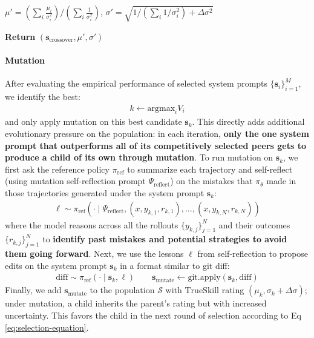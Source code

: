 \documentclass{article}
\theoremstyle{plain}
\theoremstyle{definition}
\theoremstyle{remark}
\begin{document}
\begin{algorithm}[t]
\begin{algorithmic}
        \STATE $\mu' = ({\sum}_{i}\frac{\mu_{i}}{\sigma_{i}^{2}})/({\sum}_{i}\frac{1}{\sigma_{i}^{2}})$, $\sigma' = \sqrt{{{1}/({{\sum}_{i}{{1}/{\sigma_{i}^{2}}}}) + \Delta \sigma^{2}}}$
        
        \STATE \textbf{Return} $(\mathbf{s}_{\text{crossover}}, \mu', \sigma')$
    \end{algorithmic}
\end{algorithm}

\vspace{-5pt}
\paragraph{Mutation} After evaluating the empirical performance of selected system prompts $\{\mathbf{s}_{i}\}_{i=1}^{M}$, we identify the best:
\begin{align}
    k \leftarrow \mathrm{argmax}_{i} V_{i}
\end{align}
and only apply mutation on this best candidate $\mathbf{s}_{k}$. This directly adds additional evolutionary pressure on the population: in each iteration, \textbf{only the one system prompt that outperforms all of its competitively selected peers gets to produce a child of its own through mutation}. To run mutation on $\mathbf{s}_{k}$,  we first ask the reference policy $\pi_{\text{ref}}$ to summarize each trajectory and self-reflect (using mutation self-reflection prompt $\Psi_{\text{reflect}}$) on the mistakes that $\pi_{\theta}$ made in those trajectories generated under the system prompt $\mathbf{s}_{k}$:
\begin{align*}
    \ell \sim \pi_{\text{ref}}(\cdot \mid \Psi_{\text{reflect}}, (x, y_{k,1}, r_{k,1}), \dots, (x, y_{k,N}, r_{k,N}) ) 
\end{align*}
where the model reasons across all the rollouts $\{y_{k,j}\}_{j=1}^{N}$ and their outcomes $\{r_{k,j}\}_{j=1}^{N}$ to \textbf{identify past mistakes and potential strategies to avoid them going forward}. Next, we use the lessons $\ell$ from self-reflection to propose edits on the system prompt $\mathbf{s}_{k}$ in a format similar to git diff:
\begin{align*}
    \mathrm{diff} \sim \pi_{\text{ref}}(\cdot \mid \mathbf{s}_{k}, \ell) \qquad \mathbf{s}_{\text{mutate}} \leftarrow \mathrm{git}.\mathrm{apply}(\mathbf{s}_{k}, \mathrm{diff})
\end{align*}
Finally, we add $\mathbf{s}_{\text{mutate}}$ to the population $\mathcal{S}$ with $\mathrm{TrueSkill}$ rating $(\mu_{k}, \sigma_{k}+\Delta \sigma)$; under mutation, a child inherits the parent's rating but with increased uncertainty. This favors the child in the next round of selection according to Eq \eqref{eq:selection-equation}.
\end{document}
